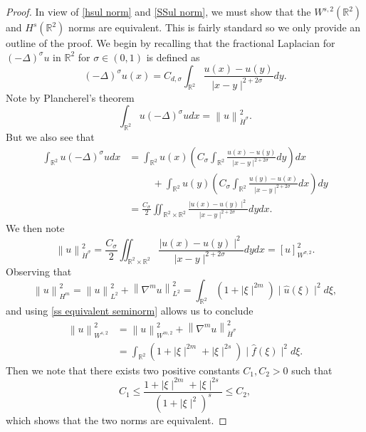 \documentclass[10pt,a4paper]{amsart}
\newcommand{\R}{\mathbb{R}}
\newcommand{\abs}[1]{\mid\!#1\!\mid}
\newcommand{\norm}[2]{\left\lVert#1\right\rVert_{#2}}
\begin{document}
\begin{proof}
In view of \eqref{hsul norm} and \eqref{SSul norm}, we must show that the $W^{s,2}(\R^2)$ and $H^s(\R^2)$ norms are equivalent. This is fairly standard so we only provide an outline of the proof. We begin by recalling that the fractional Laplacian for $(-\Delta)^{\sigma}u$ in $\R^2$  for $\sigma \in (0,1)$ is defined as 
$$
(-\Delta)^{\sigma}u(x) = C_{d,\sigma}\int_{\R^2} \frac{u(x)-u(y)}{\abs{x-y}^{2+2\sigma}}dy.
$$
Note by Plancherel's theorem
$$
\int_{\R^2} u (-\Delta)^{\sigma} u dx = \norm{u}{\dot{H}^{\sigma}}^2.
$$
But we also see that 
\begin{align*}
\int_{\R^2} u (-\Delta)^{\sigma} u dx &= \int_{\R^2} u(x) \left(C_{\sigma}\int_{\R^2} \frac{u(x)-u(y)}{\abs{x-y}^{2+2\sigma}}dy\right)dx\\&\hspace{1cm}+ \int_{\R^2} u(y) \left(C_{\sigma}\int_{\R^2} \frac{u(y)-u(x)}{\abs{x-y}^{2+2\sigma}}dx\right)dy\\
&=
\frac{C_{\sigma}}{2} \iint_{\R^2 \times \R^2} \frac{\abs{u(x)-u(y)}^2}{\abs{x-y}^{2+2\sigma}}dydx.
\end{align*}
We then note
\begin{equation}
\label{ss equivalent seminorm}
\norm{u}{\dot{H}^{\sigma}}^2 = \frac{C_{\sigma}}{2} \iint_{\R^2 \times \R^2} \frac{\abs{u(x)-u(y)}^2}{\abs{x-y}^{2+2\sigma}}dydx=[u]_{W^{\sigma,2}}^2.
\end{equation}
Observing that 
$$
\norm{u}{H^m}^2 = \norm{u}{L^2}^2 + \norm{\nabla^mu}{L^2}^2 = \int_{\R^2} (1+\abs{\xi}^{2m})\abs{\hat{u}(\xi)}^2d\xi,$$
and using \eqref{ss equivalent seminorm} allows us to conclude
\begin{align*}
\norm{u}{W^{s,2}}^2 &= \norm{u}{W^{m,2}}^2 + \norm{\nabla^mu}{\dot{H}^{\sigma}}^2 \\ 
&= \int_{\R^2} (1+\abs{\xi}^{2m}+\abs{\xi}^{2s})\abs{\hat{f}(\xi)}^2 d\xi.
\end{align*}
Then we note that there exists two positive constants $C_1,C_2>0$ such that 
$$
C_1 \leq \frac{1+\abs{\xi}^{2m}+\abs{\xi}^{2s}}{(1+\abs{\xi}^2)^s} \leq C_2,
$$
which shows that the two norms are equivalent.
\end{proof}
\end{document}
